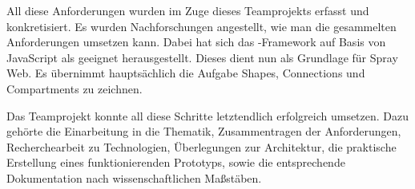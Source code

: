 All diese Anforderungen wurden im Zuge dieses Teamprojekts erfasst und konkretisiert.
Es wurden Nachforschungen angestellt, wie man die gesammelten Anforderungen
umsetzen kann. Dabei hat sich das \dd-Framework auf Basis von JavaScript als
geeignet herausgestellt. Dieses dient nun als Grundlage für Spray Web.
Es übernimmt hauptsächlich die Aufgabe Shapes, Connections und Compartments zu zeichnen.

Das Teamprojekt konnte all diese Schritte letztendlich erfolgreich umsetzen. 
Dazu gehörte die Einarbeitung in die Thematik, Zusammentragen der Anforderungen,
Recherchearbeit zu Technologien, Überlegungen zur Architektur, die praktische Erstellung eines funktionierenden Prototyps,
sowie die entsprechende Dokumentation nach wissenschaftlichen Maßstäben.
